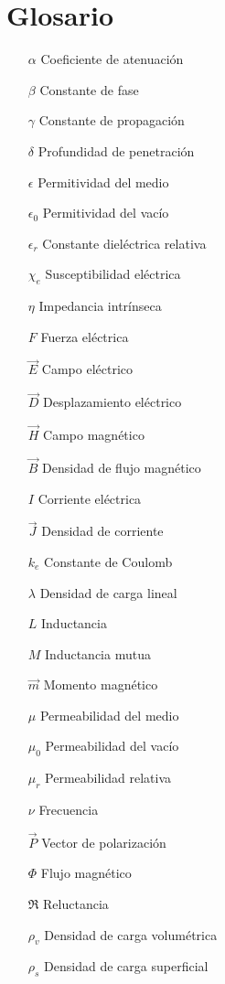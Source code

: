 \documentclass[10pt,conference]{IEEEtran}
\numberwithin{table}{section}
\begin{document}
\section{Glosario}
\begin{itemize}[leftmargin=1.5cm]
    \item[$\alpha$] Coeficiente de atenuación
    \item[$\beta$] Constante de fase
    \item[$\gamma$] Constante de propagación
    \item[$\delta$] Profundidad de penetración
    \item[$\epsilon$] Permitividad del medio
    \item[$\epsilon_0$] Permitividad del vacío
    \item[$\epsilon_r$] Constante dieléctrica relativa
    \item[$\chi_e$] Susceptibilidad eléctrica
    \item[$\eta$] Impedancia intrínseca
    \item[$F$] Fuerza eléctrica
    \item[$\vec{E}$] Campo eléctrico
    \item[$\vec{D}$] Desplazamiento eléctrico
    \item[$\vec{H}$] Campo magnético
    \item[$\vec{B}$] Densidad de flujo magnético
    \item[$I$] Corriente eléctrica
    \item[$\vec{J}$] Densidad de corriente
    \item[$k_e$] Constante de Coulomb
    \item[$\lambda$] Densidad de carga lineal
    \item[$L$] Inductancia
    \item[$M$] Inductancia mutua
    \item[$\vec{m}$] Momento magnético
    \item[$\mu$] Permeabilidad del medio
    \item[$\mu_0$] Permeabilidad del vacío
    \item[$\mu_r$] Permeabilidad relativa
    \item[$\nu$] Frecuencia
    \item[$\vec{P}$] Vector de polarización
    \item[$\Phi$] Flujo magnético
    \item[$\Re$] Reluctancia
    \item[$\rho_v$] Densidad de carga volumétrica
    \item[$\rho_s$] Densidad de carga superficial

\end{itemize}
\end{document}
